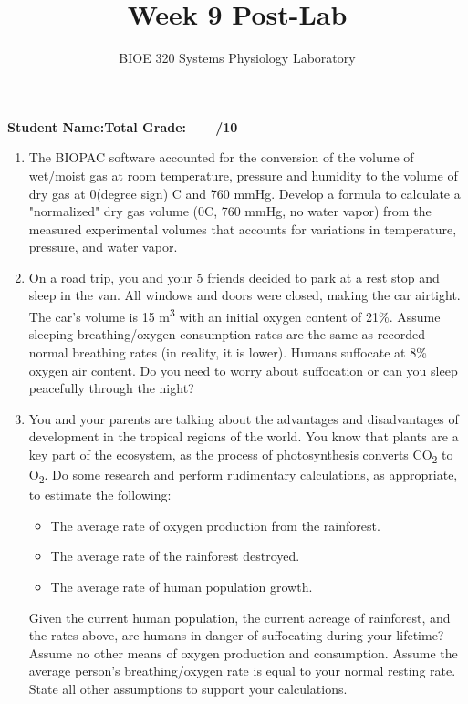 \documentclass{article}
\title{Week 9 Post-Lab}
\author{BIOE 320 Systems Physiology Laboratory}
\date{}
\begin{document}
\maketitle
\large

\textbf{Student Name:}\hfill 	\textbf{Total Grade:\ \ \ \ /10}\vspace{0.5cm}

\begin{enumerate}
	\item The BIOPAC software accounted for the conversion of the volume of wet/moist gas at room temperature, pressure and humidity to the volume of dry gas at 0(degree sign) C and 760 mmHg. Develop a formula to calculate a "normalized" dry gas volume (0C, 760 mmHg, no water vapor) from the measured experimental volumes that accounts for variations in temperature, pressure, and water vapor.
	\item On a road trip, you and your 5 friends decided to park at a rest stop and sleep in the van. All windows and doors were closed, making the car airtight. The car's volume is 15 m\textsuperscript{3} with an initial oxygen content of 21\%. Assume sleeping breathing/oxygen consumption rates are the same as recorded normal breathing rates (in reality, it is lower). Humans suffocate at 8\% oxygen air content. Do you need to worry about suffocation or can you sleep peacefully through the night?
	\item You and your parents are talking about the advantages and disadvantages of development in the tropical regions of the world. You know that plants are a key part of the ecosystem, as the process of photosynthesis converts CO\textsubscript{2} to O\textsubscript{2}. Do some research and perform rudimentary calculations, as appropriate, to estimate the following:\begin{itemize}
		\item The average rate of oxygen production from the rainforest.
		\item The average rate of the rainforest destroyed.
		\item The average rate of human population growth.
	\end{itemize} 
	
	Given the current human population, the current acreage of rainforest, and the rates above, are humans in danger of suffocating during your lifetime? Assume no other means of oxygen production and consumption. Assume the average person's breathing/oxygen rate is equal to your normal resting rate. State all other assumptions to support your calculations.
\end{enumerate}
\end{document}
